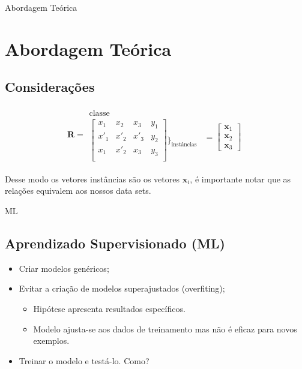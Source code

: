 \documentclass[compress]{beamer}
\begin{document}
\begin{frame}{Abordagem Teórica}
    \section{Abordagem Teórica}
    \subsection*{Considerações}
    \begin{align*}
        \mathbf{R}=\begin{array}{cc}
             \text{classe} \\
             \left[\begin{array}{ccc|c}
                  x_1& x_2&x_3& y_1\\
                  x'_1& x'_2&x'_3&y_2\\
                  x_1& x'_2&x_3&y_3\\
             \end{array}\right]\Bigg\}_{\text{instâncias}}
        \end{array}\begin{array}{c}\\=\begin{bmatrix}\mathbf{x}_1\\\mathbf{x}_2\\\mathbf{x}_3\end{bmatrix}\end{array}
    \end{align*}
    
    Desse modo os vetores instâncias são os vetores $\mathbf{x}_i$, é importante notar que as relações equivalem aos nossos data sets.
\end{frame}
\begin{frame}{ML}
    \subsection{Aprendizado Supervisionado (ML)}
    \begin{itemize}
        \item Criar modelos genéricos;
        \item Evitar a criação de modelos superajustados (overfiting);
        \begin{itemize}
            \item Hipótese apresenta resultados específicos.
            \item Modelo ajusta-se aos dados de treinamento mas não é eficaz para novos exemplos.\cite{ferreira2017metodos}
        \end{itemize}
        \item Treinar o modelo e testá-lo. Como?
    \end{itemize}
\end{frame}
\end{document}
